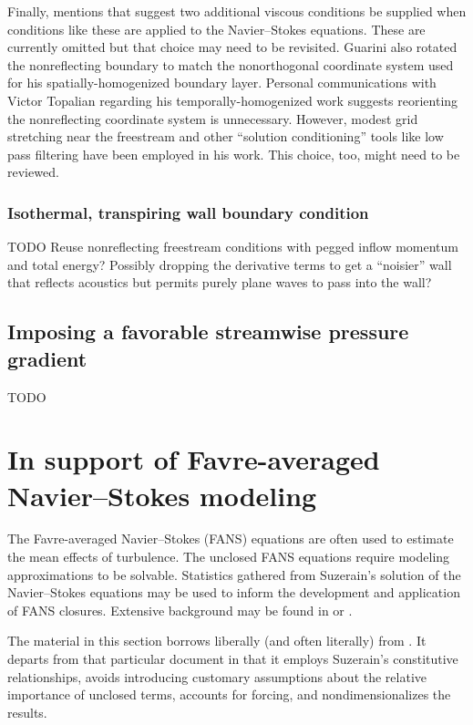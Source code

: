 \documentclass[letterpaper,11pt,nointlimits,reqno,draft]{amsart}
\begin{document}
Finally, \citet{Guarini1998} mentions that \citet{Poinsot1992Boundary}
suggest two additional viscous conditions be supplied when conditions like
these are applied to the Navier--Stokes equations.  These are currently omitted
but that choice may need to be revisited.  Guarini also rotated the
nonreflecting boundary to match the nonorthogonal coordinate system used for
his spatially-homogenized boundary layer.  Personal communications with Victor
Topalian regarding his temporally-homogenized work suggests reorienting the
nonreflecting coordinate system is unnecessary.  However, modest grid
stretching near the freestream and other ``solution conditioning'' tools like
low pass filtering have been employed in his work.  This choice, too, might
need to be reviewed.

\subsubsection{Isothermal, transpiring wall boundary condition}

TODO  Reuse nonreflecting freestream conditions with pegged inflow momentum and
total energy?  Possibly dropping the derivative terms to get a ``noisier''
wall that reflects acoustics but permits purely plane waves to pass into
the wall?

\subsection{Imposing a favorable streamwise pressure gradient}

TODO

\section{In support of Favre-averaged Navier--Stokes modeling}
\label{sec:supportFANS}

The Favre-averaged Navier--Stokes (FANS) equations are often used to estimate
the mean effects of turbulence.  The unclosed FANS equations require modeling
approximations to be solvable.  Statistics gathered from Suzerain's solution of
the Navier--Stokes equations may be used to inform the development and
application of FANS closures.  Extensive background may be found in
\citet{Chassaing2010} or \citet{SmitsDussauge2005}.

The material in this section borrows liberally (and often literally) from
\citet{OliverFANSModels2011}.  It departs from that particular document in that
it employs Suzerain's constitutive relationships, avoids introducing customary
assumptions about the relative importance of unclosed terms, accounts for
forcing, and nondimensionalizes the results.
\end{document}
